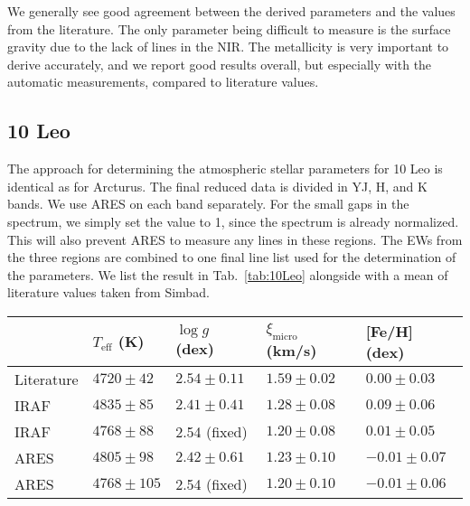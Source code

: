 \documentclass{aa}
\begin{document}
We generally see good agreement between the derived parameters and the values
from the literature. The only parameter being difficult to measure is the
surface gravity due to the lack of  lines in the NIR. The
metallicity is very important to derive accurately, and we report good results
overall, but especially with the automatic measurements, compared to literature
values.





\subsection{10 Leo}
\label{sec:10Leo}

The approach for determining the atmospheric stellar parameters for 10 Leo is
identical as for Arcturus. The final reduced data is divided in YJ, H, and K
bands. We use ARES on each band separately. For the small gaps in the spectrum,
we simply set the value to 1, since the spectrum is already normalized. This
will also prevent ARES to measure any lines in these regions. The EWs from the
three regions are combined to one final line list used for the determination of
the parameters. We list the result in Tab.~\ref{tab:10Leo} alongside with a mean
of literature values taken from Simbad.

\begin{table*}[htb!]
    \caption{The derived parameters for 10 Leo with and without fixed surface
             gravity after 3$\sigma$ outlier removal. The literature values are
             a simple mean of all the available parameters on Simbad with the
             corresponding standard error. There is no microturbulence
             available, so we derived it ourself using the empirical relation
             from \citet{Adibekyan2015} for each set of parameters.}
    \label{tab:10Leo}
    \centering
    \begin{tabular}{lllll}
      \hline\hline
                     & $T_\mathrm{eff}$ (K) &  $\log g$ (dex)  &   $\xi_\mathrm{micro}$ (km/s)   & [Fe/H] (dex)     \\
      \hline
        Literature   & $4720 \pm  42$       &  $2.54 \pm 0.11$ &    $1.59 \pm 0.02$              & $ 0.00 \pm 0.03$ \\
      \hline
        IRAF         & $4835 \pm  85$       &  $2.41 \pm 0.41$ &    $1.28 \pm 0.08$              & $ 0.09 \pm 0.06$ \\
        IRAF         & $4768 \pm  88$       &   2.54 (fixed)   &    $1.20 \pm 0.08$              & $ 0.01 \pm 0.05$ \\
      \hline
        ARES         & $4805 \pm  98$       &  $2.42 \pm 0.61$ &    $1.23 \pm 0.10$              & $-0.01 \pm 0.07$ \\
        ARES         & $4768 \pm 105$       &   2.54 (fixed)   &    $1.20 \pm 0.10$              & $-0.01 \pm 0.06$ \\
      \hline
    \end{tabular}
\end{table*}
\end{document}
